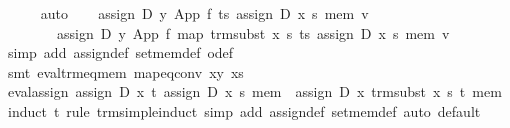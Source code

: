 \begin{isabellebody}
\ \ \ \ \isamarkupfalse%
\ auto\isanewline
\ \ \isamarkupfalse%
\ {}assign\ D\ y\ {}App\ f\ ts{}\ {}assign\ D\ x\ s\ mem{}\ v\ {}\isanewline
\ \ \ \ \ \ \ \ assign\ D\ y\ {}App\ f\ {}map\ {}trm{}subst\ x\ s{}\ ts{}{}\ {}assign\ D\ x\ s\ mem{}\ v{}\isanewline
\ \ \ \ \isamarkupfalse%
\ {}simp\ add{}\ assign{}def\ set{}mem{}def\ o{}def{}\isanewline
\ \ \ \ \isamarkupfalse%
\ {}smt\ eval{}trm{}eq{}mem\ map{}eq{}conv\ xy\ xs{}\isanewline
{}\isamarkupfalse%
%
\endisatagproof
{\isafoldproof}%
%
\isadelimproof
\isanewline
%
\endisadelimproof
\isanewline
{}\isamarkupfalse%
\ eval{}assign{}{}\ {}assign\ D\ x\ t\ {}assign\ D\ x\ s\ mem{}\ {}\ assign\ D\ x\ {}trm{}subst\ x\ s\ t{}\ mem{}\isanewline
%
\isadelimproof
%
\endisadelimproof
%
\isatagproof
{}\isamarkupfalse%
\ {}induct\ t\ rule{}\ trm{}simple{}induct{}\ simp\ add{}\ assign{}def\ set{}mem{}def{}\ auto{}\ default{}\isanewline

\end{isabellebody}
